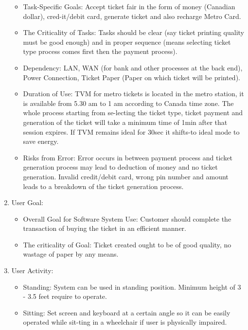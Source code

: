 \documentclass[11pt,oneside]{book}
\begin{document}
\begin{enumerate}
\begin{itemize}
      \item  Task-Specific Goals: Accept ticket fair in the form of money (Canadian dollar), cred-it/debit card, generate ticket and also recharge Metro Card.
\item The Criticality of Tasks: Tasks should be clear (say ticket printing quality must be
good enough) and in proper sequence (means selecting ticket type process comes
first then the payment process).
\item Dependency: LAN, WAN (for bank and other processes at the back end),
Power Connection, Ticket Paper (Paper on which ticket will be printed).
\item Duration of Use: TVM for metro tickets is located in the metro station, it is available from 5.30 am to 1 am according to Canada time zone. The whole process starting from se-lecting the ticket type, ticket payment and generation of the ticket will take a minimum time of 1min after that session expires. If TVM remains ideal for 30sec it shifts-to ideal mode to save energy.
\item Risks from Error: Error occurs in between payment process and ticket generation process may lead to deduction of money and no ticket generation. Invalid credit/debit card, wrong pin number and amount leads to a breakdown of the ticket generation process.

        
 
        \end{itemize}
        
    \item User Goal:
        \begin{itemize}
        
        \item Overall Goal for Software System Use: Customer should complete the transaction of buying the ticket in an efficient manner.
\item The criticality of Goal: Ticket created ought to be of good quality, no wastage of paper by any means.

        
 
        \end{itemize}
        
    \item User Activity:
        \begin{itemize}
        
       \item Standing: System can be used in standing position. Minimum height of 3 - 3.5 feet require to operate.
\item Sitting: Set screen and keyboard at a certain angle so it can be easily operated while sit-ting in a wheelchair if user is physically impaired.


\end{itemize}
\end{enumerate}
\end{document}
